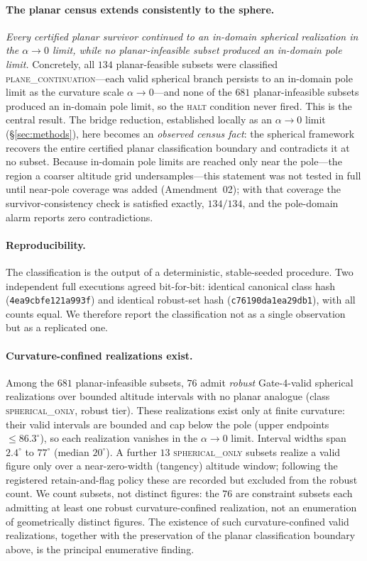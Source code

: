 \documentclass[11pt]{article}
\begin{document}
\paragraph{The planar census extends consistently to the sphere.}
\emph{Every certified planar survivor continued to an in-domain spherical
realization in the $\alpha\to 0$ limit, while no planar-infeasible subset
produced an in-domain pole limit.} Concretely, all $134$ planar-feasible subsets were classified \textsc{plane\_continuation}---each valid spherical branch persists to an in-domain pole limit as the curvature scale $\alpha\to 0$---and none of the $681$ planar-infeasible subsets produced an in-domain pole limit, so the \textsc{halt} condition never fired. This is the central result. The bridge reduction, established locally as an $\alpha\to 0$ limit
(\S\ref{sec:methods}), here becomes an \emph{observed census fact}: the spherical framework recovers the entire certified planar classification boundary and contradicts it at no subset. Because in-domain pole limits are reached only near the pole---the region a coarser altitude grid undersamples---this statement was not tested in full until near-pole coverage was added (Amendment~02); with that coverage the survivor-consistency check is satisfied exactly, $134/134$, and the pole-domain alarm reports zero contradictions.

\paragraph{Reproducibility.}
The classification is the output of a deterministic, stable-seeded procedure.
Two independent full executions agreed bit-for-bit: identical canonical class
hash (\texttt{4ea9cbfe121a993f}) and identical robust-set hash (\texttt{c76190da1ea29db1}), with all counts equal. We therefore report the
classification not as a single observation but as a replicated one.

\paragraph{Curvature-confined realizations exist.}
Among the $681$ planar-infeasible subsets, $76$ admit \emph{robust} Gate-4-valid spherical realizations over bounded altitude intervals with no planar analogue (class \textsc{spherical\_only}, robust tier). These realizations exist only at finite curvature: their valid intervals are bounded and cap below the pole (upper endpoints $\le 86.3^\circ$), so each realization vanishes in the $\alpha\to 0$ limit. Interval widths span $2.4^\circ$ to $77^\circ$ (median $20^\circ$). A further $13$ \textsc{spherical\_only} subsets realize a valid figure only over a near-zero-width (tangency) altitude window; following the registered retain-and-flag policy these are recorded but excluded from the robust count. We count subsets, not distinct figures: the $76$ are constraint subsets each admitting at least one robust curvature-confined realization, not an enumeration of geometrically distinct figures. The existence of such curvature-confined valid realizations, together with the preservation of the planar classification boundary above, is the principal enumerative finding.
\end{document}
